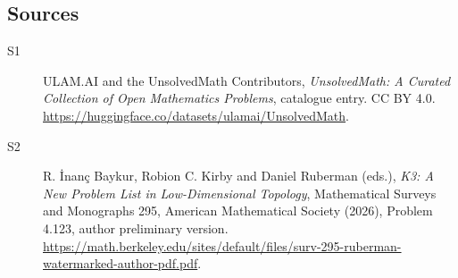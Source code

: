 \documentclass[11pt]{article}
\begin{document}
\subsection{Sources}
\begin{description}
\item[\hypertarget{source:statement:1}{S1}] ULAM.AI and the UnsolvedMath Contributors, \emph{UnsolvedMath: A Curated Collection of Open Mathematics Problems}, catalogue entry. CC BY 4.0. \url{https://huggingface.co/datasets/ulamai/UnsolvedMath}.
\item[\hypertarget{source:statement:2}{S2}] R. İnanç Baykur, Robion C. Kirby and Daniel Ruberman (eds.), \emph{K3: A New Problem List in Low-Dimensional Topology}, Mathematical Surveys and Monographs 295, American Mathematical Society (2026), Problem 4.123, author preliminary version. \url{https://math.berkeley.edu/sites/default/files/surv-295-ruberman-watermarked-author-pdf.pdf}.
\end{description}
\label{end:statement}
\end{document}
